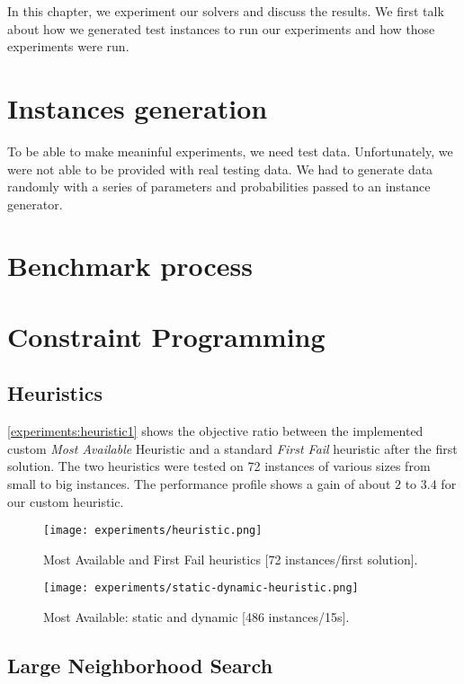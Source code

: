 \documentclass[../../thesis.tex]{subfiles}
\begin{document}
In this chapter, we experiment our solvers and discuss the results. 
We first talk about how we generated test instances to run our experiments and how 
those experiments were run.

\section{Instances generation}

To be able to make meaninful experiments, we need test data. Unfortunately, we were 
not able to be provided with real testing data. 
We had to generate data randomly with a series of parameters and probabilities passed 
to an instance generator. 

\section{Benchmark process}

\section{Constraint Programming}

\subsection{Heuristics}

\autoref{experiments:heuristic1} shows the objective ratio between the implemented custom \textit{Most Available} Heuristic and a standard 
\textit{First Fail} heuristic after the first solution. The two heuristics were tested on 72 instances of various sizes from small to big instances.
The performance profile shows a gain of about $2$ to $3.4$ for our custom heuristic.


\begin{figure}
  \centering
  \texttt{[image: experiments/heuristic.png]}
  \caption{Most Available and First Fail heuristics [72 instances/first solution].}
  \label{experiments:heuristic1}
\end{figure}

\begin{figure}
  \centering
  \texttt{[image: experiments/static-dynamic-heuristic.png]}
  \caption{Most Available: static and dynamic [486 instances/15s].}
  \label{experiments:heuristic2}
\end{figure}


\subsection{Large Neighborhood Search}
\end{document}
